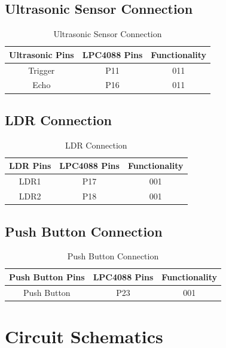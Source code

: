 \documentclass[12pt]{article}
\begin{document}
\subsection{Ultrasonic Sensor Connection}
\begin {table}[H]
\begin{center}
\begin{tabular}{|c|c|c|} \hline 
\textbf{Ultrasonic Pins} & \textbf{LPC4088 Pins} & \textbf{Functionality} \\ 
\hline 
Trigger & P11 & 011  \\ \hline 
Echo & P16 & 011 \\ \hline 
\end{tabular}
\end{center}
\caption {Ultrasonic Sensor Connection}
\end {table}

\subsection{LDR Connection}
\begin {table}[H]
\begin{center}
\begin{tabular}{|c|c|c|} \hline 
\textbf{LDR Pins} & \textbf{LPC4088 Pins} & \textbf{Functionality} \\ 
\hline 
LDR1 & P17 & 001  \\ \hline 
LDR2 & P18 & 001 \\ \hline 
\end{tabular}
\end{center}
\caption {LDR Connection}
\end {table}

\subsection{Push Button Connection}
\begin {table}[H]
\begin{center}
\begin{tabular}{|c|c|c|} \hline 
\textbf{Push Button Pins} & \textbf{LPC4088 Pins} & \textbf{Functionality} \\ 
\hline 
Push Button & P23 & 001  \\ \hline 
\end{tabular}
\end{center}
\caption {Push Button Connection}
\end {table}
\newpage
\section{Circuit Schematics}
\end{document}
